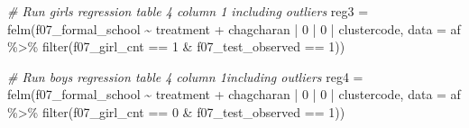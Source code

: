 \documentclass[
]{article}
\newenvironment{Shaded}{\begin{snugshade}}{\end{snugshade}}
\newcommand{\AttributeTok}[1]{\textcolor[rgb]{0.77,0.63,0.00}{#1}}
\newcommand{\CommentTok}[1]{\textcolor[rgb]{0.56,0.35,0.01}{\textit{#1}}}
\newcommand{\DecValTok}[1]{\textcolor[rgb]{0.00,0.00,0.81}{#1}}
\newcommand{\FunctionTok}[1]{\textcolor[rgb]{0.00,0.00,0.00}{#1}}
\newcommand{\NormalTok}[1]{#1}
\newcommand{\OtherTok}[1]{\textcolor[rgb]{0.56,0.35,0.01}{#1}}
\newcommand{\SpecialCharTok}[1]{\textcolor[rgb]{0.00,0.00,0.00}{#1}}
\begin{document}
\begin{Shaded}
\begin{Highlighting}[]
\CommentTok{\# Run girls regression table 4 column 1 including outliers}
\NormalTok{reg3 }\OtherTok{=} \FunctionTok{felm}\NormalTok{(f07\_formal\_school }\SpecialCharTok{\textasciitilde{}}\NormalTok{ treatment }\SpecialCharTok{+}\NormalTok{ chagcharan }\SpecialCharTok{|} \DecValTok{0} \SpecialCharTok{|} \DecValTok{0} \SpecialCharTok{|}\NormalTok{ clustercode, }
            \AttributeTok{data =}\NormalTok{ af }\SpecialCharTok{\%\textgreater{}\%} \FunctionTok{filter}\NormalTok{(f07\_girl\_cnt }\SpecialCharTok{==} \DecValTok{1} \SpecialCharTok{\&} 
\NormalTok{                                 f07\_test\_observed }\SpecialCharTok{==} \DecValTok{1}\NormalTok{))}

\CommentTok{\# Run boys regression table 4 column 1including outliers}
\NormalTok{reg4 }\OtherTok{=} \FunctionTok{felm}\NormalTok{(f07\_formal\_school }\SpecialCharTok{\textasciitilde{}}\NormalTok{ treatment }\SpecialCharTok{+}\NormalTok{ chagcharan }\SpecialCharTok{|} \DecValTok{0} \SpecialCharTok{|} \DecValTok{0} \SpecialCharTok{|}\NormalTok{ clustercode, }
            \AttributeTok{data =}\NormalTok{ af }\SpecialCharTok{\%\textgreater{}\%} \FunctionTok{filter}\NormalTok{(f07\_girl\_cnt }\SpecialCharTok{==} \DecValTok{0} \SpecialCharTok{\&} 
\NormalTok{                                 f07\_test\_observed }\SpecialCharTok{==} \DecValTok{1}\NormalTok{))}
\end{Highlighting}
\end{Shaded}
\end{document}
